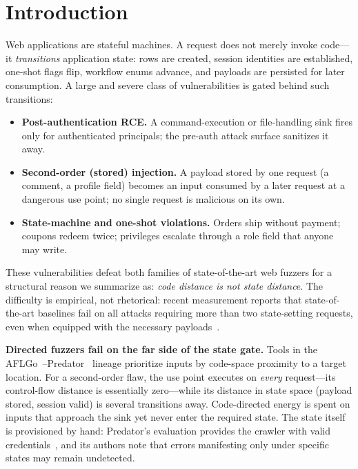 \documentclass[letterpaper,twocolumn,10pt]{article}
\begin{document}
\section{Introduction}
\label{sec:intro}

Web applications are stateful machines. A request does not merely invoke code---it \emph{transitions} application state: rows are created, session identities are established, one-shot flags flip, workflow enums advance, and payloads are persisted for later consumption. A large and severe class of vulnerabilities is gated behind such transitions:

\begin{itemize}
\item \textbf{Post-authentication RCE.} A command-execution or file-handling sink fires only for authenticated principals; the pre-auth attack surface sanitizes it away.
\item \textbf{Second-order (stored) injection.} A payload stored by one request (a comment, a profile field) becomes an input consumed by a later request at a dangerous use point; no single request is malicious on its own.
\item \textbf{State-machine and one-shot violations.} Orders ship without payment; coupons redeem twice; privileges escalate through a role field that anyone may write.
\end{itemize}

These vulnerabilities defeat both families of state-of-the-art web fuzzers for a structural reason we summarize as: \emph{code distance is not state distance}. The difficulty is empirical, not rhetorical: recent measurement reports that state-of-the-art baselines fail on all attacks requiring more than two state-setting requests, even when equipped with the necessary payloads~\cite{ariadne}.

\textbf{Directed fuzzers fail on the far side of the state gate.} Tools in the AFLGo~\cite{aflgo}--Predator~\cite{predator} lineage prioritize inputs by code-space proximity to a target location. For a second-order flaw, the use point executes on \emph{every} request---its control-flow distance is essentially zero---while its distance in state space (payload stored, session valid) is several transitions away. Code-directed energy is spent on inputs that approach the sink yet never enter the required state. The state itself is provisioned by hand: Predator's evaluation provides the crawler with valid credentials~\cite{predator}, and its authors note that errors manifesting only under specific states may remain undetected.
\end{document}
